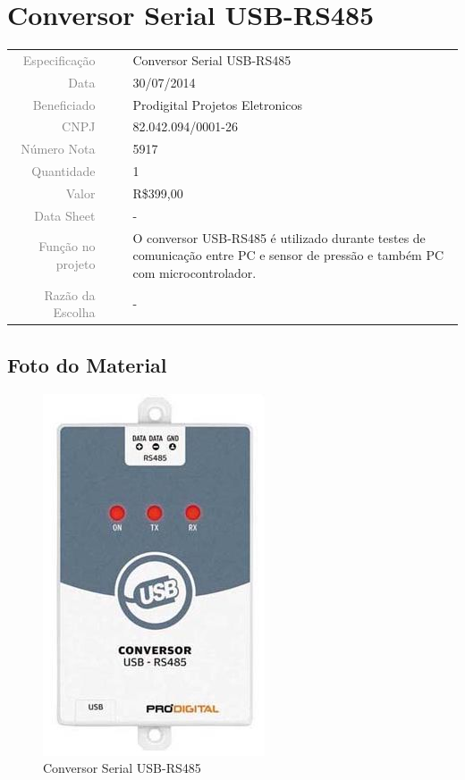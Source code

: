 

\section{Conversor Serial USB-RS485}
\label{conversor}


\begin{table}[ht!]

	\begin{tabular}{r l|l p{12cm} }
		
		\textcolor{gray}{Especificação} &&& 	{Conversor Serial USB-RS485}\\
		\textcolor{gray}{Data} &&& 				{30/07/2014}\\
        \textcolor{gray}{Beneficiado} &&&		{Prodigital Projetos Eletronicos} \\
        \textcolor{gray}{CNPJ} &&& 				{82.042.094/0001-26} \\
        \textcolor{gray}{Número Nota} &&& 		{5917} \\
		\textcolor{gray}{Quantidade} &&& 		{1} \\
		\textcolor{gray}{Valor} &&& 			{R\$399,00} \\
		\textcolor{gray}{Data Sheet} &&& 		{-} \\

		\textcolor{gray}{Função no projeto} &&& {O conversor USB-RS485 é utilizado
		durante testes de comunicação entre PC e sensor de pressão e também PC com
		microcontrolador.}
		\\
		\textcolor{gray}{Razão da Escolha} &&& {-}
		

	\end{tabular}
\end{table}

\newpage
\subsection{Foto do Material}
\begin{figure}[H]
 \centering
 \includegraphics[width=0.5\columnwidth]{Conversor/foto}
 \caption{Conversor Serial USB-RS485}
\end{figure}

